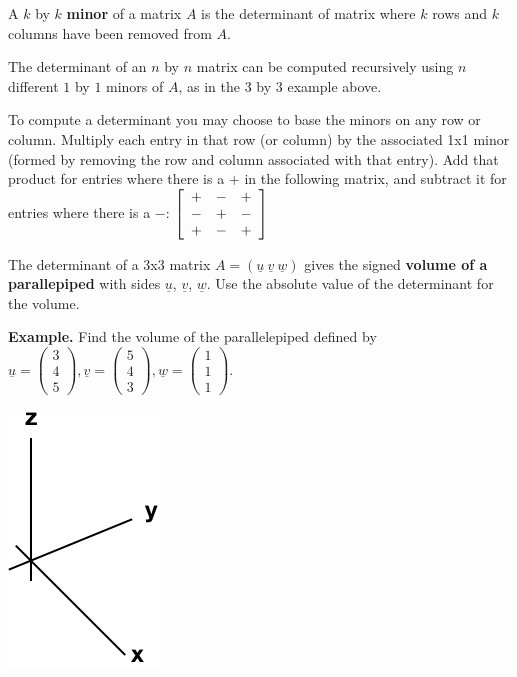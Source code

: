 \documentclass[12pt,letterpaper,noanswers]{exam}
\newcommand{\mb}[1]{\underline{#1}}
\begin{document}
\begin{tcolorbox}
A $k$ by $k$ \textbf{minor} of a matrix $A$ is the determinant of matrix where $k$ rows and $k$ columns have been removed from $A$.

The determinant of an $n$ by $n$ matrix can be computed recursively using $n$ different $1$ by $1$ minors of $A$, as in the 3 by 3 example above.

To compute a determinant you may choose to base the minors on any row or column.  Multiply each entry in that row (or column) by the associated 1x1 minor (formed by removing the row and column associated with that entry).  Add that product for entries where there is a $+$ in the following matrix, and subtract it for entries where there is a $-$: $\left[\begin{array}{c c c} + & - & + \\ - & + & - \\ + & - & + \end{array}\right] $

The determinant of a 3x3 matrix $A = \left(\mb{u}\ \mb{v} \ \mb{w}\right)$ gives the signed \textbf{volume of a parallepiped} with sides $\mb{u}$, $\mb{v}$, $\mb{w}$.  Use the absolute value of the determinant for the volume.
\end{tcolorbox}


\eject
\noindent\textbf{Example.}
Find the volume of the parallelepiped defined by $\mb{u} = \left(\begin{array}{c} 3 \\ 4 \\ 5\end{array}\right), \mb{v} = \left(\begin{array}{c}5 \\ 4 \\ 3\end{array}\right), \mb{w} = \left(\begin{array}{c} 1 \\ 1 \\ 1\end{array}\right)$. %


\includegraphics[scale=0.6]{img/C02axes.png}
\end{document}
